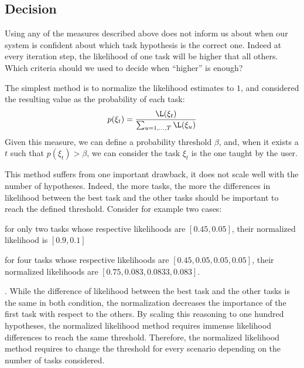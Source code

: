 
\subsection{Decision}
\label{chapter:lfui:confidence}

Using any of the measures described above does not inform us about when our system is confident about which task hypothesis is the correct one. Indeed at every iteration step, the likelihood of one task will be higher that all others. Which criteria should we used to decide when ``higher'' is enough?

The simplest method is to normalize the likelihood estimates to $1$, and considered the resulting value as the probability of each task:
%
\begin{eqnarray}
p(\xi_t) = \frac{\L(\xi_t)}{\sum_{u = 1,\ldots, T} \L(\xi_u)}
\label{eq:probanormalize} 
\end{eqnarray}
%
Given this measure, we can define a probability threshold $\beta$, and, when it exists a $t$ such that $p(\xi_t) > \beta$, we can consider the task $\xi_t$ is the one taught by the user.

This method suffers from one important drawback, it does not scale well with the number of hypotheses. Indeed, the more tasks, the more the differences in likelihood between the best task and the other tasks should be important to reach the defined threshold. Consider for example two cases: \begin{inparaenum}[a)] \item for only two tasks whose respective likelihoods are $[0.45, 0.05]$, their normalized likelihood is $[0.9,0.1]$ \item for four tasks whose respective likelihoods are $[0.45, 0.05, 0.05, 0.05]$, their normalized likelihoods are $[0.75, 0.083, 0.0833, 0.083]$. \end{inparaenum}. While the difference of likelihood between the best task and the other tasks is the same in both condition, the normalization decreases the importance of the first task with respect to the others. By scaling this reasoning to one hundred hypotheses, the normalized likelihood method requires immense likelihood differences to reach the same threshold. Therefore, the normalized likelihood method requires to change the threshold for every scenario depending on the number of tasks considered. 

